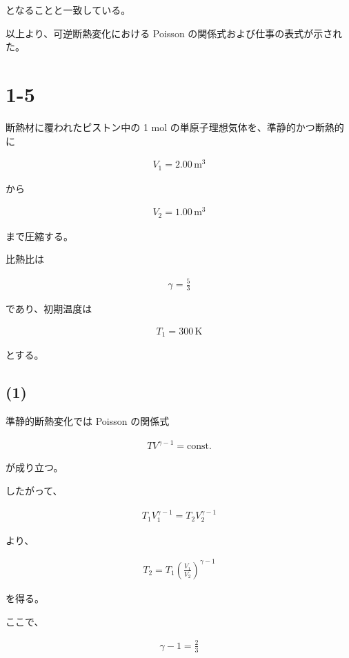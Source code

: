 \documentclass[platex,dvipdfmx,a4paper]{jsarticle}
\begin{document}
となることと一致している。

以上より、可逆断熱変化における Poisson の関係式および仕事の表式が示された。
\section{1-5}

断熱材に覆われたピストン中の 1 mol の単原子理想気体を、準静的かつ断熱的に

\begin{align*}
V_1=2.00\,\mathrm{m^3}
\end{align*}

から

\begin{align*}
V_2=1.00\,\mathrm{m^3}
\end{align*}

まで圧縮する。

比熱比は

\begin{align*}
\gamma=\frac53
\end{align*}

であり、初期温度は

\begin{align*}
T_1=300\,\mathrm{K}
\end{align*}

とする。

\subsection{(1)}

準静的断熱変化では Poisson の関係式

\begin{align*}
TV^{\gamma-1}
=
\mathrm{const.}
\end{align*}

が成り立つ。

したがって、

\begin{align*}
T_1V_1^{\gamma-1}
=
T_2V_2^{\gamma-1}
\end{align*}

より、

\begin{align*}
T_2
=
T_1
\left(
\frac{V_1}{V_2}
\right)^{\gamma-1}
\end{align*}

を得る。

ここで、

\begin{align*}
\gamma-1
=
\frac23
\end{align*}
\end{document}
